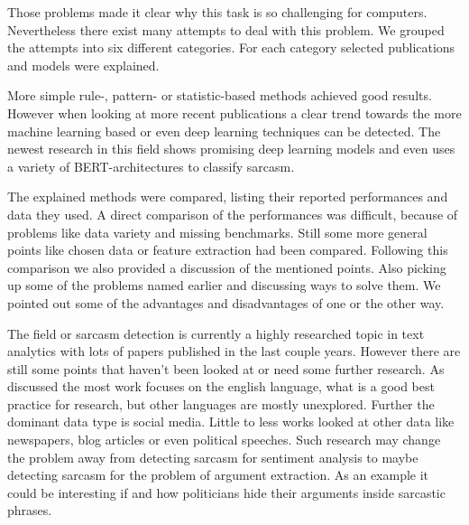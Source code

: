 \documentclass[sigconf,  review=false, nonacm=true]{acmart}
\begin{document}
Those problems made it clear why this task is so challenging for computers. Nevertheless there exist many attempts to deal with this problem. We grouped the attempts into six different categories. For each category selected publications and models were explained.

More simple rule-, pattern- or statistic-based methods achieved good results. However when looking at more recent publications a clear trend towards the more machine learning based or even deep learning techniques can be detected. The newest research in this field shows promising deep learning models and even uses a variety of BERT-architectures to classify sarcasm. 

The explained methods were compared, listing their reported performances and data they used. A direct comparison of the performances was difficult, because of problems like data variety and missing benchmarks. Still some more general points like chosen data or feature extraction had been compared. Following this comparison we also provided a discussion of the mentioned points. Also picking up some of the problems named earlier and discussing ways to solve them. We pointed out some of the advantages and disadvantages of one or the other way.

The field or sarcasm detection is currently a highly researched topic in text analytics with lots of papers published in the last couple years. However there are still some points that haven't been looked at or need some further research. As discussed the most work focuses on the english language, what is a good best practice for research, but other languages are mostly unexplored. Further the dominant data type is social media. Little to less works looked at other data like newspapers, blog articles or even political speeches. Such research may change the problem away from detecting sarcasm for sentiment analysis to maybe detecting sarcasm for the problem of argument extraction. As an example it could be interesting if and how politicians hide their arguments inside sarcastic phrases. 





\appendix
\end{document}
